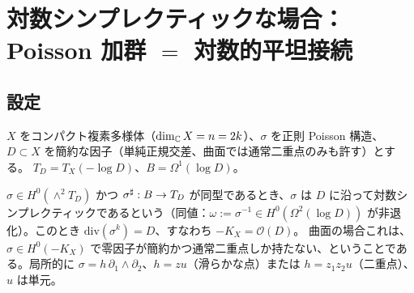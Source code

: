 \section{対数シンプレクティックな場合：Poisson 加群 $=$ 対数的平坦接続}\label{sec:logsymp}
\subsection{設定}
$X$ をコンパクト複素多様体（$\dim_\mathbb C X=n=2k$）、$\sigma$ を正則 Poisson 構造、$D\subset X$ を簡約な因子（単純正規交差、曲面では通常二重点のみも許す）とする。
$T_D=T_X(-\log D)$、$B=\Omega^1(\log D)$。

\begin{defn}[対数シンプレクティック]\tC
$\sigma\in H^0(\wedge^2T_D)$ かつ $\sigma^\sharp:B\to T_D$ が同型であるとき、$\sigma$ は $D$ に沿って対数シンプレクティックであるという（同値：$\omega:=\sigma^{-1}\in H^0(\Omega^2(\log D))$ が非退化）。このとき $\mathrm{div}(\sigma^k)=D$、すなわち $-K_X=\mathcal O(D)$。
曲面の場合これは、$\sigma\in H^0(-K_X)$ で零因子が簡約かつ通常二重点しか持たない、ということである。局所的に $\sigma=h\,\partial_1\wedge\partial_2$、$h=zu$（滑らかな点）または $h=z_1z_2u$（二重点）、$u$ は単元。
\end{defn}

